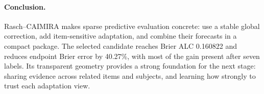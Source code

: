 \paragraph{Conclusion.}
Rasch--CAIMIRA makes sparse predictive evaluation concrete: use a stable global correction, add item-sensitive adaptation, and combine their forecasts in a compact package. The selected candidate reaches Brier ALC 0.160822 and reduces endpoint Brier error by 40.27\%, with most of the gain present after seven labels. Its transparent geometry provides a strong foundation for the next stage: sharing evidence across related items and subjects, and learning how strongly to trust each adaptation view.
